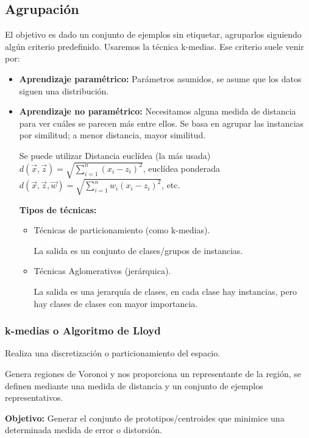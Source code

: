 \documentclass[12pt, twoside, openright]{report} %
\begin{document}
\subsection{Agrupación}
El objetivo es dado un conjunto de ejemplos sin etiquetar, agruparlos siguiendo algún criterio predefinido. Usaremos la técnica k-medias.
Ese criterio suele venir por:
\begin{itemize}
  \item \textbf{Aprendizaje paramétrico:} Parámetros asumidos, se asume que los datos siguen una distribución.
  \item \textbf{Aprendizaje no paramétrico:} Necesitamos alguna medida de distancia para ver cuáles se parecen más entre ellos. Se basa en agrupar las instancias por similitud; a menor distancia, mayor similitud. 

  Se puede utilizar Distancia euclídea (la más usada) $d\left( \vec{x},\vec{z}\right)   = \sqrt {\sum _{i=1}^{n}  \left( x_{i}-z_{i}\right)^2 }$, euclídea ponderada $d\left( \vec{x},\vec{z},\vec{w}\right)   = \sqrt {\sum _{i=1}^{n} w_i \left( x_{i}-z_{i}\right)^2 }$, etc.

  \textbf{Tipos de técnicas:}
  \begin{itemize}
    \item Técnicas de particionamiento (como k-medias).
    
    La salida es un conjunto de clases/grupos de instancias.

    \item Técnicas Aglomerativos (jerárquica).
    
    La salida es una jerarquía de clases, en cada clase hay instancias, pero hay clases de clases con mayor importancia.
  \end{itemize}
\end{itemize}

\subsubsection{k-medias o Algoritmo de Lloyd}

Realiza una discretización o particionamiento del espacio.

Genera regiones de Voronoi y nos proporciona un representante de la región, se definen mediante una medida de distancia y un conjunto de ejemplos representativos.

\textbf{Objetivo:} Generar el conjunto de prototipos/centroides que minimice una determinada medida de error o distorsión.
\end{document}
